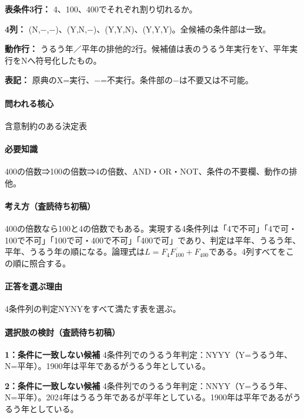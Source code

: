 \noindent\textbf{表条件3行：} 4、100、400でそれぞれ割り切れるか。\par

\noindent\textbf{4列：} (N,−,−)、(Y,N,−)、(Y,Y,N)、(Y,Y,Y)。全候補の条件部は一致。\par

\noindent\textbf{動作行：} うるう年／平年の排他的2行。候補値は表のうるう年実行をY、平年実行をNへ符号化したもの。\par

\noindent\textbf{表記：} 原典のX=実行、−=不実行。条件部の−は不要又は不可能。\par

\paragraph{問われる核心} 含意制約のある決定表

\paragraph{必要知識} 400の倍数⇒100の倍数⇒4の倍数、AND・OR・NOT、条件の不要欄、動作の排他。

\paragraph{考え方（査読待ち初稿）} 400の倍数なら100と4の倍数でもある。実現する4条件列は「4で不可」「4で可・100で不可」「100で可・400で不可」「400で可」であり、判定は平年、うるう年、平年、うるう年の順になる。論理式は\(L=F_4\overline{F_{100}}+F_{400}\)である。4列すべてをこの順に照合する。

\paragraph{正答を選ぶ理由} 4条件列の判定NYNYをすべて満たす表を選ぶ。

\paragraph{選択肢の検討（査読待ち初稿）}\mbox{}\par

\noindent\textbf{1：条件に一致しない候補} 4条件列でのうるう年判定：NYYY（Y=うるう年、N=平年）。1900年は平年であるがうるう年としている。\par

\noindent\textbf{2：条件に一致しない候補} 4条件列でのうるう年判定：NNYY（Y=うるう年、N=平年）。2024年はうるう年であるが平年としている。1900年は平年であるがうるう年としている。\par

